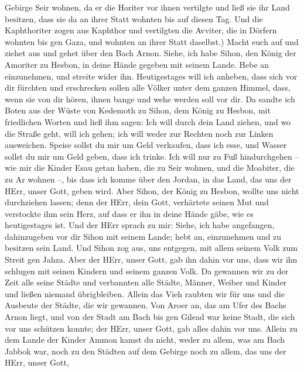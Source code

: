 Gebirge Seir wohnen, da er die Horiter vor ihnen vertilgte und ließ sie
ihr Land besitzen, dass sie da an ihrer Statt wohnten bis auf diesen
Tag.  Und die Kaphthoriter zogen aus Kaphthor und
vertilgten die Avviter, die in Dörfern wohnten bis gen Gaza, und wohnten
an ihrer Statt daselbst.)  Macht euch auf und ziehet aus
und gehet über den Bach Arnon. Siehe, ich habe Sihon, den König der
Amoriter zu Hesbon, in deine Hände gegeben mit seinem Lande. Hebe an
einzunehmen, und streite wider ihn.  Heutigestages will ich
anheben, dass sich vor dir fürchten und erschrecken sollen alle Völker
unter dem ganzen Himmel, dass, wenn sie von dir hören, ihnen bange und
wehe werden soll vor dir.  Da sandte ich Boten aus der
Wüste von Kedemoth zu Sihon, dem König zu Hesbon, mit friedlichen Worten
und ließ ihm sagen:  Ich will durch dein Land ziehen, und
wo die Straße geht, will ich gehen; ich will weder zur Rechten noch zur
Linken ausweichen.  Speise sollst du mir um Geld verkaufen,
dass ich esse, und Wasser sollst du mir um Geld geben, dass ich trinke.
Ich will nur zu Fuß hindurchgehen --  wie mir die Kinder
Esau getan haben, die zu Seir wohnen, und die Moabiter, die zu Ar wohnen
--, bis dass ich komme über den Jordan, in das Land, das uns der HErr,
unser Gott, geben wird.  Aber Sihon, der König zu Hesbon,
wollte uns nicht durchziehen lassen; denn der HErr, dein Gott,
verhärtete seinen Mut und verstockte ihm sein Herz, auf dass er ihn in
deine Hände gäbe, wie es heutigestages ist.  Und der HErr
sprach zu mir: Siehe, ich habe angefangen, dahinzugeben vor dir Sihon
mit seinem Lande; hebt an, einzunehmen und zu besitzen sein Land.
 Und Sihon zog aus, uns entgegen, mit allem seinem Volk zum
Streit gen Jahza.  Aber der HErr, unser Gott, gab ihn dahin
vor uns, dass wir ihn schlugen mit seinen Kindern und seinem ganzen
Volk.  Da gewannen wir zu der Zeit alle seine Städte und
verbannten alle Städte, Männer, Weiber und Kinder und ließen niemand
übrigbleiben.  Allein das Vieh raubten wir für uns und die
Ausbeute der Städte, die wir gewannen.  Von Aroer an, das
am Ufer des Bachs Arnon liegt, und von der Stadt am Bach bis gen Gilead
war keine Stadt, die sich vor uns schützen konnte; der HErr, unser Gott,
gab alles dahin vor uns.  Allein zu dem Lande der Kinder
Ammon kamst du nicht, weder zu allem, was am Bach Jabbok war, noch zu
den Städten auf dem Gebirge noch zu allem, das uns der HErr, unser Gott,
